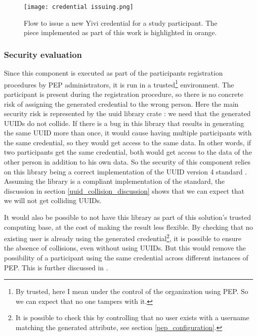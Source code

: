 \documentclass{report}
\begin{document}
\begin{figure}[H]
		\texttt{[image: credential issuing.png]}
		\caption{Flow to issue a new Yivi credential for a study participant. The piece implemented as part of this work is highlighted in orange.}
\end{figure}

\subsubsection{Security evaluation}
Since this component is executed as part of the participants registration procedures by PEP administrators, it is run in a trusted\footnote{By trusted, here I mean under the
control of the organization using PEP. So we can expect that no one tampers with it.}  environment. The participant is present during the registration procedure, so there is no
concrete risk of assigning the generated credential to the wrong person. Here the main security risk is represented by the uuid library crate \cite{uuid_crate}: we need that the
generated UUIDs do not collide. If there is a bug in this library that results in generating the same UUID more than once, it would cause having multiple participants with the same
credential, so they would get access to the same data. In other words, if two participants get the same credential, both would get access to the data of the other person in
addition to his own data. So the security of this component relies on this library being a correct implementation of the UUID version 4 standard \cite{uuid_rfc}.  Assuming the library is a
compliant implementation of the standard, the discussion in section \ref{uuid_collision_discussion} shows that we can expect that we will not get colliding UUIDs. \par
It would also be possible to not have this library as part of this solution's trusted computing base, at the cost of making the result less flexible. By checking that no existing
user is already using the generated credential\footnote{It is possible to check this by controlling that no user exists with a username matching the generated attribute, see
section \ref{pep_configuration}.}, it is possible to ensure the absence of collisions, even without using UUIDs. But this would remove the possibility of a participant
using the same credential across different instances of PEP. This is further discussed in .
\end{document}
